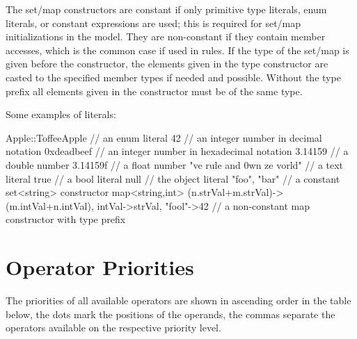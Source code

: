 The set/map constructors are constant if only primitive type literals, enum literals, or constant expressions are used; 
this is required for set/map initializations in the model.
They are non-constant if they contain member accesses, which is the common case if used in rules.
If the type of the set/map is given before the constructor, the elements given in the type constructor are casted to the specified member types if needed and possible.
Without the type prefix all elements given in the constructor must be of the same type.

\begin{example}
Some examples of literals:
\begin{grgen}
Apple::ToffeeApple // an enum literal
42 // an integer number in decimal notation
0xdeadbeef // an integer number in hexadecimal notation
3.14159 // a double number
3.14159f // a float number
"ve rule and 0wn ze vorld" // a text literal
true // a bool literal
null // the object literal
{ "foo", "bar" } // a constant set<string> constructor
map<string,int>{ (n.strVal+m.strVal)->(m.intVal+n.intVal), intVal->strVal, "fool"->42 } // a non-constant map constructor with type prefix
\end{grgen}
\end{example}


\section{Operator Priorities}

The priorities of all available operators are shown in ascending order in the table below, the dots mark the positions of the operands, the commas separate the operators available on the respective priority level.

